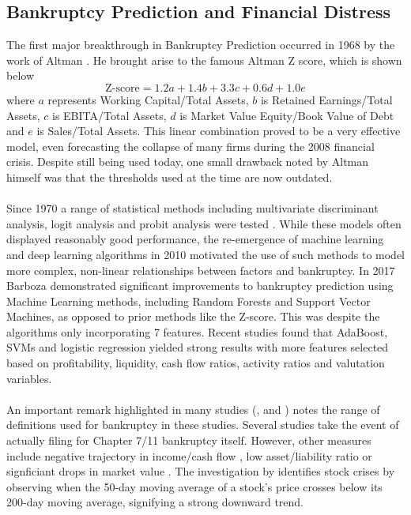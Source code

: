 \documentclass[a4paper]{report}
\begin{document}
\subsection{Bankruptcy Prediction and Financial Distress}
The first major breakthrough in Bankruptcy Prediction occurred in 1968 by the work of Altman \citep{altman1968financial}. He brought arise to the famous Altman Z score, which is shown below  
\begin{equation}
  \text{Z-score} = 1.2a + 1.4b + 3.3c + 0.6d + 1.0e
\end{equation}
where \(a\) represents Working Capital/Total Assets, \(b\) is Retained Earnings/Total Assets, \(c\) is EBITA/Total Assets, \(d\) is Market Value Equity/Book Value of Debt and \(e\) is Sales/Total Assets. This linear combination proved to be a very effective model, even forecasting
the collapse of many firms during the 2008 financial crisis. Despite still being used today, one small drawback noted by Altman himself was that the thresholds used at the time are now outdated.\\\\Since 1970 a range of statistical methods including multivariate discriminant analysis, logit analysis and probit analysis were tested \citep{bellovary2007review}. While
these models often displayed reasonably good performance, the re-emergence of machine learning and deep learning algorithms in 2010 motivated the use of such methods to model more complex, non-linear relationships between factors and bankruptcy. In 2017 Barboza \citep{barboza2017machine} demonstrated significant improvements to bankruptcy prediction using Machine Learning methods, 
including Random Forests and Support Vector Machines, as opposed to prior methods like the Z-score. This was despite the algorithms only incorporating 7 features. Recent studies found that AdaBoost, SVMs and logistic regression yielded strong results with more features selected based on profitability, liquidity, cash flow ratios, activity ratios and 
valutation variables. \\\\An 
important remark highlighted in many studies (\citep{bellovary2007review},\citep{shi2019overview} and \citep{zhao2024survey}) notes the range of definitions used for bankruptcy in these studies. Several studies take the event of actually filing for Chapter 7/11 bankruptcy itself. However, other measures include negative trajectory in income/cash flow \citep{mate2023comparative}, low asset/liability ratio
or signficiant drops in market value \citep{mckibben2017predicting}. The investigation by \cite{naik2021novel} identifies stock crises by observing when the 50-day moving average of a stock's price crosses below its 200-day moving average, signifying a strong downward trend.
\end{document}
